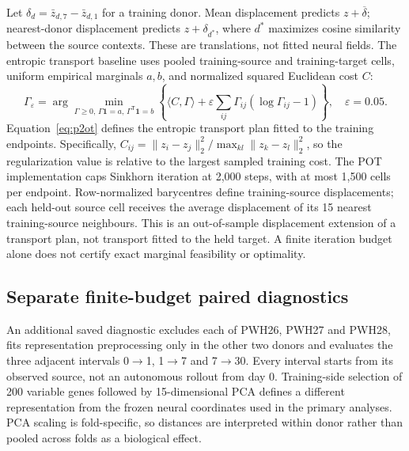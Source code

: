 \documentclass[10pt,a4paper]{article}
\begin{document}
Let $\delta_d=\bar z_{d,7}-\bar z_{d,1}$ for a training donor. Mean displacement predicts $z+\overline\delta$; nearest-donor displacement predicts $z+\delta_{d^*}$, where $d^*$ maximizes cosine similarity between the source contexts. These are translations, not fitted neural fields. The entropic transport baseline uses pooled training-source and training-target cells, uniform empirical marginals $a,b$, and normalized squared Euclidean cost $C$:
\begin{equation}
\Gamma_\varepsilon=\arg\min_{\Gamma\geq0,\,\Gamma\mathbf1=a,\,\Gamma^{\mathsf T}\mathbf1=b}
\left\{\langle C,\Gamma\rangle+\varepsilon\sum_{ij}\Gamma_{ij}(\log\Gamma_{ij}-1)\right\},\quad\varepsilon=0.05.\label{eq:p2ot}
\end{equation}
Equation~\eqref{eq:p2ot} defines the entropic transport plan fitted to the training endpoints. Specifically, $C_{ij}=\|z_i-z_j\|_2^2/\max_{kl}\|z_k-z_l\|_2^2$, so the regularization value is relative to the largest sampled training cost. The POT implementation caps Sinkhorn iteration at 2,000 steps, with at most 1,500 cells per endpoint. Row-normalized barycentres define training-source displacements; each held-out source cell receives the average displacement of its 15 nearest training-source neighbours. This is an out-of-sample displacement extension of a transport plan, not transport fitted to the held target. A finite iteration budget alone does not certify exact marginal feasibility or optimality.

\subsection{Separate finite-budget paired diagnostics}
An additional saved diagnostic excludes each of PWH26, PWH27 and PWH28, fits representation preprocessing only in the other two donors and evaluates the three adjacent intervals 0$\rightarrow$1, 1$\rightarrow$7 and 7$\rightarrow$30. Every interval starts from its observed source, not an autonomous rollout from day 0. Training-side selection of 200 variable genes followed by 15-dimensional PCA defines a different representation from the frozen neural coordinates used in the primary analyses. PCA scaling is fold-specific, so distances are interpreted within donor rather than pooled across folds as a biological effect.
\end{document}
